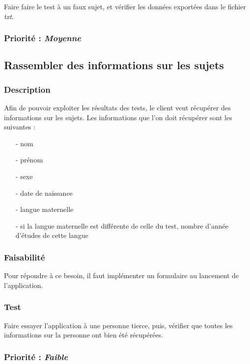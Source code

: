\documentclass[a4paper,twoside,10pt]{report}
\begin{document}
    Faire faire le test à un faux sujet, et vérifier les données exportées dans le fichier \textit{txt}.

  \subsubsection{Priorité : \textit{Moyenne}}


\subsection{Rassembler des informations sur les sujets}

  \subsubsection{Description}

    Afin de pouvoir exploiter les résultats des tests, le client veut récupérer des informations sur les sujets.
    Les informations que l’on doit récupérer sont les suivantes :\\
    \begin{itemize}
      \item[-]  nom
      \item[-]  prénom
      \item[-]  sexe
      \item[-]  date de naissance
      \item[-]  langue maternelle
      \item[-]  si la langue maternelle est différente de celle du test, nombre d’année d’études de cette langue
    \end{itemize}

  \subsubsection{Faisabilité}
    
    Pour répondre à ce besoin, il faut implémenter un formulaire au lancement de l’application.

  \subsubsection{Test}

    Faire essayer l’application à une personne tierce, puis, vérifier que toutes les informations sur la personne ont bien été récupérées.

  \subsubsection{Priorité : \textit{Faible}}
\end{document}
